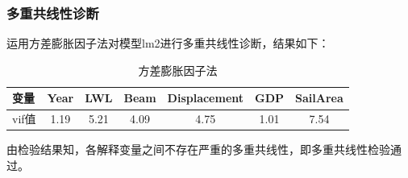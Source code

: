 \documentclass[a4paper,12pt,onecolumn,oneside]{article}
\begin{document}
\subsubsection{多重共线性诊断}
运用方差膨胀因子法对模型lm2进行多重共线性诊断，结果如下：\par
\begin{table}[htbp]
	\centering
	\caption{方差膨胀因子法}\vspace{0.5\baselineskip}
	\label{tab:vif_test}
	\begin{tabular}{@{}lcccccc@{}}
		\toprule
		变量 & Year & LWL & Beam & Displacement & GDP & SailArea \\
		\midrule
		vif值 & 1.19 & 5.21 & 4.09 & 4.75 & 1.01 & 7.54 \\
		\bottomrule
	\end{tabular}
\end{table}
由检验结果知，各解释变量之间不存在严重的多重共线性，即多重共线性检验通过。
\end{document}
